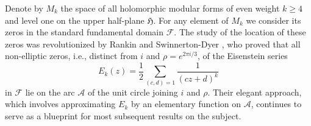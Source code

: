 \documentclass[12pt]{amsart}
\theoremstyle{plain} %
\theoremstyle{definition}
\theoremstyle{remark}
\numberwithin{equation}{section}
\newcommand{\R}{\mathbb R}
\newcommand{\Q}{\mathbb Q}
\newcommand{\h}{\mathfrak{H}}
\begin{document}


Denote by $M_k$ the space of all holomorphic modular forms of even weight $k\ge 4$ and level one on the upper half-plane $\h$. For any element of $M_k$ we consider its zeros in the standard fundamental domain $\mathcal{F}$. The study of the location of these zeros was revolutionized by Rankin and Swinnerton-Dyer \cite{rankin-swinnerton-dyer}, who proved that all non-elliptic zeros, i.e., distinct from $i$ and $\rho=e^{2\pi i/3}$, of the Eisenstein series \[ E_k(z)=\frac{1}{2} \sum_{ (c,d)=1} \frac{1}{(cz+d)^k}\] in $\mathcal{F}$ lie on the arc $\mathcal{A}$ of the unit circle joining $i$ and $\rho$. Their elegant approach, which involves approximating $E_k$ by an elementary function on $\mathcal{A}$, continues to serve as a blueprint for most subsequent results on the subject.
\end{document}

